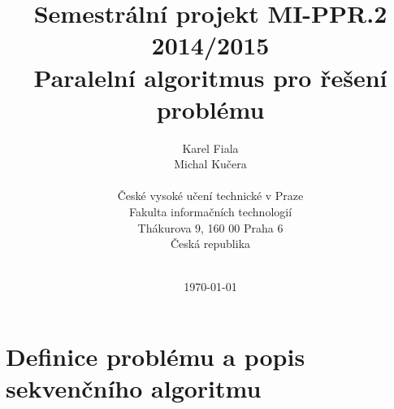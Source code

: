 \documentclass[12pt,a4paper]{article}
\begin{document}
\title{Semestrální projekt MI-PPR.2 2014/2015\\
Paralelní algoritmus pro řešení problému \\
\vspace{10px}}
\author{Karel Fiala \\ Michal Kučera \\
\vspace{10px} \\
\small České vysoké učení technické v Praze\\
\small Fakulta informačních technologií\\
\small Thákurova 9, 160 00 Praha 6\\
\small Česká republika \\
\vspace{10px} \\
}
\date{\today}
\maketitle




\clearpage
\tableofcontents
\clearpage

\section{Definice problému a popis sekvenčního algoritmu}

\end{document}
